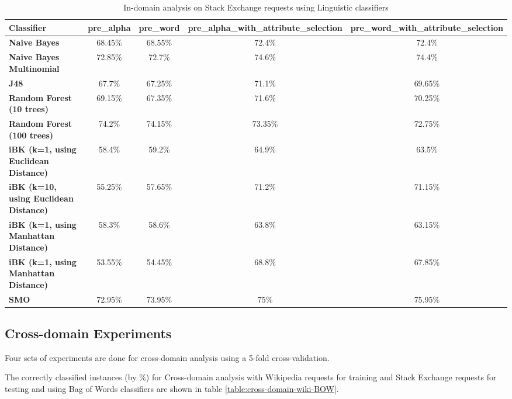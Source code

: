 \documentclass[conference]{IEEEtran}
\begin{document}
\begin{table*}[htbp]
\caption{In-domain analysis on Stack Exchange requests using Linguistic classifiers }
\centering
\vspace{5pt}
\begin{tabular}{|l|c|c|c|c|}
\hline
\textbf{Classifier} & \textbf{pre\_alpha} & \textbf{pre\_word} & \textbf{pre\_alpha\_with\_attribute\_selection} & \textbf{pre\_word\_with\_attribute\_selection} \\
\hline\hline
\textbf{Naive Bayes} & 68.45\% & 68.55\% & 72.4\% & 72.4\% \\ 
\hline
\textbf{Naive Bayes Multinomial} & 72.85\% & 72.7\% & 74.6\% & 74.4\% \\ 
\hline
\textbf{J48} & 67.7\% & 67.25\% & 71.1\% & 69.65\% \\ 
\hline
\textbf{Random Forest (10 trees)} & 69.15\% & 67.35\% & 71.6\% & 70.25\% \\ 
\hline
\textbf{Random Forest (100 trees)} & 74.2\% & 74.15\% & 73.35\% & 72.75\% \\ 
\hline
\textbf{iBK (k=1, using Euclidean Distance)} & 58.4\% & 59.2\% & 64.9\% & 63.5\% \\ 
\hline
\textbf{iBK (k=10, using Euclidean Distance)} & 55.25\% & 57.65\% & 71.2\% & 71.15\% \\ 
\hline
\textbf{iBK (k=1, using Manhattan Distance)} & 58.3\% & 58.6\% & 63.8\% & 63.15\% \\ 
\hline
\textbf{iBK (k=1, using Manhattan Distance)} & 53.55\% & 54.45\% & 68.8\% & 67.85\% \\ 
\hline
\textbf{SMO} & 72.95\% & 73.95\% & 75\% & 75.95\% \\ 
\hline
\hline
\end{tabular}
\label{table:in-domain-stack-Ling}
\end{table*}

\subsection{Cross-domain Experiments}
Four sets of experiments are done for cross-domain analysis using a 5-fold cross-validation. 

The correctly classified instances (by \%) for Cross-domain analysis with Wikipedia requests for training and Stack Exchange requests for testing and using Bag of Words classifiers are shown in table \ref{table:cross-domain-wiki-BOW}.
\end{document}
